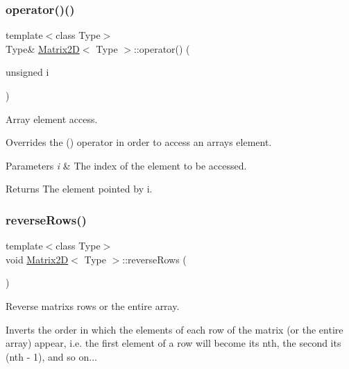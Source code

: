\subsubsection{\texorpdfstring{operator()()}{operator()()}\hspace{0.1cm}{\footnotesize\ttfamily [4/4]}}
{\footnotesize\ttfamily template$<$class Type$>$ \\
Type\& \mbox{\hyperlink{classMatrix2D}{Matrix2D}}$<$ Type $>$\+::operator() (\begin{DoxyParamCaption}\item[{unsigned}]{i }\end{DoxyParamCaption})\hspace{0.3cm}{\ttfamily [inline]}}



Array element access. 

Overrides the \textquotesingle{}()\textquotesingle{} operator in order to access an array\textquotesingle{}s element. 
\begin{DoxyParams}{Parameters}
{\em i} & The index of the element to be accessed. \\
\hline
\end{DoxyParams}
\begin{DoxyReturn}{Returns}
The element pointed by i. 
\end{DoxyReturn}
\mbox{\label{classMatrix2D_aaaefe293f1a0549afb2e506b71b18490}} 
\subsubsection{\texorpdfstring{reverse\+Rows()}{reverseRows()}}
{\footnotesize\ttfamily template$<$class Type$>$ \\
void \mbox{\hyperlink{classMatrix2D}{Matrix2D}}$<$ Type $>$\+::reverse\+Rows (\begin{DoxyParamCaption}{ }\end{DoxyParamCaption})\hspace{0.3cm}{\ttfamily [inline]}}



Reverse matrix\textquotesingle{}s rows or the entire array. 

Inverts the order in which the elements of each row of the matrix (or the entire array) appear, i.\+e. the first element of a row will become its nth, the second its (nth -\/ 1), and so on... \mbox{\label{classMatrix2D_abf7025332a5f4f75b172fb1a3ad56176}} 
